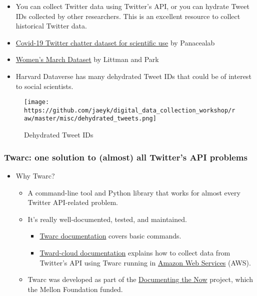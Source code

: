 \documentclass[
]{book}
\providecommand{\tightlist}{%
  \setlength{\itemsep}{0pt}\setlength{\parskip}{0pt}}
\begin{document}
\begin{itemize}
\item
  You can collect Twitter data using Twitter's API, or you can hydrate Tweet IDs collected by other researchers. This is an excellent resource to collect historical Twitter data.
\item
  \href{http://www.panacealab.org/covid19/}{Covid-19 Twitter chatter dataset for scientific use} by Panacealab
\item
  \href{https://dataverse.harvard.edu/dataset.xhtml?persistentId=doi:10.7910/DVN/5ZVMOR}{Women's March Dataset} by Littman and Park
\item
  Harvard Dataverse has many dehydrated Tweet IDs that could be of interest to social scientists.
\end{itemize}

\begin{figure}
\centering
\texttt{[image: https://github.com/jaeyk/digital\_data\_collection\_workshop/raw/master/misc/dehydrated\_tweets.png]}
\caption{Dehydrated Tweet IDs}
\end{figure}

\hypertarget{twarc-one-solution-to-almost-all-twitters-api-problems}{%
\subsubsection{Twarc: one solution to (almost) all Twitter's API problems}\label{twarc-one-solution-to-almost-all-twitters-api-problems}}

\begin{itemize}
\item
  Why Twarc?

  \begin{itemize}
  \item
    A command-line tool and Python library that works for almost every Twitter API-related problem.
  \item
    It's really well-documented, tested, and maintained.

    \begin{itemize}
    \tightlist
    \item
      \href{https://scholarslab.github.io/learn-twarc/06-twarc-command-basics}{Twarc documentation} covers basic commands.
    \item
      \href{https://twarc-cloud.readthedocs.io/_/downloads/en/stable/pdf/}{Tward-cloud documentation} explains how to collect data from Twitter's API using Twarc running in \href{https://aws.amazon.com/}{Amazon Web Services} (AWS).
    \end{itemize}
  \item
    Twarc was developed as part of the \href{https://www.docnow.io/}{Documenting the Now} project, which the Mellon Foundation funded.
  \end{itemize}
\end{itemize}
\end{document}

